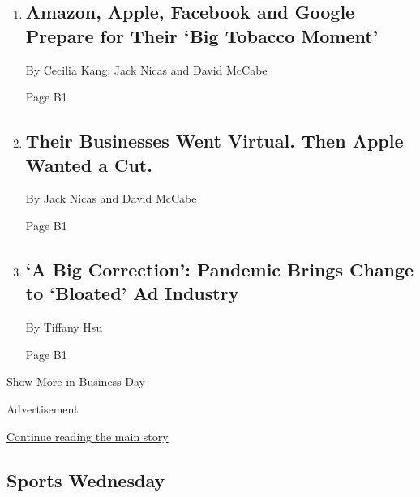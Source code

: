 \begin{enumerate}
\def\labelenumi{\arabic{enumi}.}
\item
  \href{/2020/07/28/technology/amazon-apple-facebook-google-antitrust-hearing.html}{}

  \hypertarget{amazon-apple-facebook-and-google-prepare-for-their-big-tobacco-moment-1}{%
  \subsection{Amazon, Apple, Facebook and Google Prepare for Their `Big
  Tobacco
  Moment'}\label{amazon-apple-facebook-and-google-prepare-for-their-big-tobacco-moment-1}}

  By Cecilia Kang, Jack Nicas and David McCabe

  Page B1
\item
  \href{/2020/07/28/technology/apple-app-store-airbnb-classpass.html}{}

  \hypertarget{their-businesses-went-virtual-then-apple-wanted-a-cut}{%
  \subsection{Their Businesses Went Virtual. Then Apple Wanted a
  Cut.}\label{their-businesses-went-virtual-then-apple-wanted-a-cut}}

  By Jack Nicas and David McCabe

  Page B1
\item
  \href{/2020/07/28/business/media/coronavirus-pandemic-advertising-industry.html}{}

  \hypertarget{a-big-correction-pandemic-brings-change-to-bloated-ad-industry}{%
  \subsection{`A Big Correction': Pandemic Brings Change to `Bloated' Ad
  Industry}\label{a-big-correction-pandemic-brings-change-to-bloated-ad-industry}}

  By Tiffany Hsu

  Page B1
\end{enumerate}

Show More in Business Day

Advertisement

\protect\hyperlink{after-mid4}{Continue reading the main story}

\hypertarget{sports-wednesday}{%
\subsection{Sports Wednesday}\label{sports-wednesday}}


